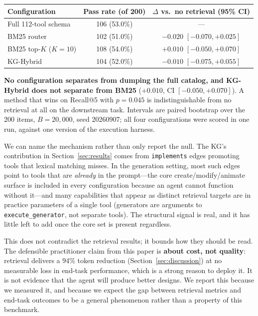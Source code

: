 \documentclass[11pt,a4paper]{article}
\begin{document}
\begin{center}
\begin{tabular}{lcc}
\toprule
Configuration & Pass rate (of 200) & $\Delta$ vs.\ no retrieval (95\% CI) \\
\midrule
Full 112-tool schema & 106 (53.0\%) & --- \\
BM25 router & 102 (51.0\%) & $-0.020$ $[-0.070, +0.025]$ \\
BM25 top-$K$ ($K=10$) & 108 (54.0\%) & $+0.010$ $[-0.050, +0.070]$ \\
KG-Hybrid & 104 (52.0\%) & $-0.010$ $[-0.075, +0.055]$ \\
\bottomrule
\end{tabular}
\end{center}

\textbf{No configuration separates from dumping the full catalog, and KG-Hybrid does not separate
from BM25} ($+0.010$, CI $[-0.050, +0.070]$). A method that wins on Recall@5 with $p=0.045$ is
indistinguishable from no retrieval at all on the downstream task. Intervals are paired bootstrap over
the 200 items, $B=20{,}000$, seed 20260907; all four configurations were scored in one run, against one
version of the execution harness.

We can name the mechanism rather than only report the null. The KG's contribution in
Section~\ref{sec:results} comes from \texttt{implements} edges promoting tools that lexical matching
misses. In the generation setting, most such edges point to tools that are \emph{already} in the
prompt---the core create/modify/animate surface is included in every configuration because an agent
cannot function without it---and many capabilities that appear as distinct retrieval targets are in
practice parameters of a single tool (generators are arguments to \texttt{execute\_generator}, not
separate tools). The structural signal is real, and it has little left to add once the core set is
present regardless.

This does not contradict the retrieval results; it bounds how they should be read. The defensible
practitioner claim from this paper is \textbf{about cost, not quality}: retrieval delivers a 94\%
token reduction (Section~\ref{sec:discussion}) at no measurable loss in end-task performance, which
is a strong reason to deploy it. It is not evidence that the agent will produce better designs. We
report this because we measured it, and because we expect the gap between retrieval metrics and
end-task outcomes to be a general phenomenon rather than a property of this benchmark.
\end{document}
